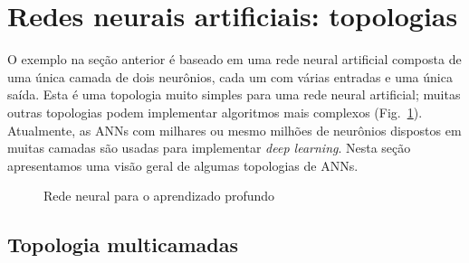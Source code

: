 \section{Redes neurais artificiais: topologias}\label{s.ann-topology}

O exemplo na seção anterior é baseado em uma rede neural artificial composta de uma única camada de dois neurônios, cada um com várias entradas e uma única saída. Esta é uma topologia muito simples para uma rede neural artificial; muitas outras topologias podem implementar algoritmos mais complexos (Fig.~\ref{fig.nn-deep}). Atualmente, as ANNs com milhares ou mesmo milhões de neurônios dispostos em muitas camadas são usadas para implementar \emph{deep learning}. Nesta seção apresentamos uma visão geral de algumas topologias de ANNs.

\begin{figure}
\begin{center}
\caption{Rede neural para o aprendizado profundo}\label{fig.nn-deep}
\end{center}
\end{figure}


\subsection{Topologia multicamadas}

